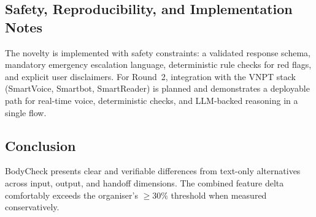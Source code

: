 \subsection{Safety, Reproducibility, and Implementation Notes}
The novelty is implemented with safety constraints: a validated response
schema, mandatory emergency escalation language, deterministic rule checks for
red flags, and explicit user disclaimers. For Round~2, integration with the
VNPT stack (SmartVoice, Smartbot, SmartReader) is planned and demonstrates a
deployable path for real-time voice, deterministic checks, and LLM-backed
reasoning in a single flow.

\subsection{Conclusion}
BodyCheck presents clear and verifiable differences from text-only
alternatives across input, output, and handoff dimensions. The combined
feature delta comfortably exceeds the organiser's \(\geq 30\%\) threshold
when measured conservatively.


